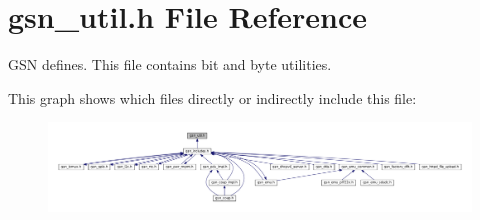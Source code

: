 \hypertarget{a00602}{
\section{gsn\_\-util.h File Reference}
\label{a00602}
}


GSN defines. This file contains bit and byte utilities.  


This graph shows which files directly or indirectly include this file:
\nopagebreak
\begin{figure}[H]
\begin{center}
\leavevmode
\includegraphics[width=400pt]{a00848}
\end{center}
\end{figure}
